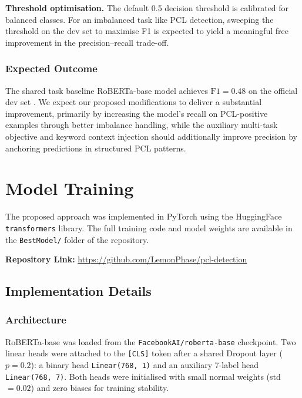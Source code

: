 \documentclass[11pt,a4paper]{article}
\begin{document}
\textbf{Threshold optimisation.}
The default 0.5 decision threshold is calibrated for balanced classes. For an imbalanced task like PCL detection, sweeping the threshold on the dev set to maximise F1 is expected to yield a meaningful free improvement in the precision--recall trade-off.

\subsubsection{Expected Outcome}

The shared task baseline RoBERTa-base model achieves $\text{F1} = 0.48$ on the official dev set \cite{perez-almendros-etal-2020-dont}. We expect our proposed modifications to deliver a substantial improvement, primarily by increasing the model's recall on PCL-positive examples through better imbalance handling, while the auxiliary multi-task objective and keyword context injection should additionally improve precision by anchoring predictions in structured PCL patterns.

\newpage
\section{Model Training}

The proposed approach was implemented in PyTorch using the HuggingFace \texttt{transformers} library. The full training code and model weights are available in the \texttt{BestModel/} folder of the repository.

\noindent\textbf{Repository Link:} \url{https://github.com/LemonPhase/pcl-detection}

\subsection{Implementation Details}

\subsubsection{Architecture}

RoBERTa-base was loaded from the \texttt{FacebookAI/roberta-base} checkpoint. Two linear heads were attached to the \texttt{[CLS]} token after a shared Dropout layer ($p=0.2$): a binary head \texttt{Linear(768, 1)} and an auxiliary 7-label head \texttt{Linear(768, 7)}. Both heads were initialised with small normal weights (std $= 0.02$) and zero biases for training stability.
\end{document}
